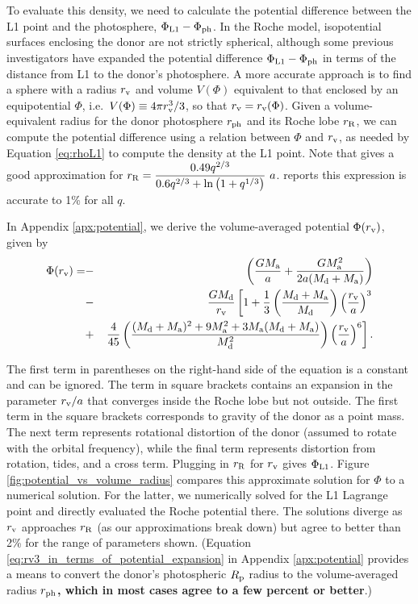 \documentclass{aastex}
\newcommand{\be}{\begin{eqnarray}}
\newcommand{\ee}{\end{eqnarray}}
\newcommand{\rv}{r_{\rm v}}
\begin{document}
To evaluate this density, we need to calculate the potential difference between the L1 point and the photosphere, $\Phi_{\rm L1}-\Phi_{\rm ph}$. In the Roche model, isopotential surfaces enclosing the donor are not strictly spherical, although some previous investigators have expanded the potential difference $\Phi_{\rm L1}-\Phi_{\rm ph}$ in terms of the distance from L1 to the donor's photosphere. A more accurate approach is to find a sphere with a radius $\rv$ and volume $V(\Phi)$ equivalent to that enclosed by an equipotential $\Phi$, i.e.\ $V(\Phi) \equiv 4\pi r_{\rm v}^3/3$, so that $r_{\rm v} = r_{\rm v}(\Phi)$. Given a volume-equivalent radius for the donor photosphere $r_{\rm ph}$ and its Roche lobe $r_{\rm R}$, we can compute the potential difference using a relation between $\Phi$ and $\rv$, as needed by Equation \ref{eq:rhoL1} to compute the density at the L1 point. Note that \citet{1983ApJ...268..368E} gives a good approximation for $r_{\rm R} = \dfrac{0.49 q^{2/3}}{0.6 q^{2/3} + \ln\left( 1 + q^{1/3} \right)}\ a$. \citet{1983ApJ...268..368E} reports this expression is accurate to 1\% for all $q$.

In Appendix \ref{apx:potential}, we derive the volume-averaged potential $\Phi(r_{\rm v})$, given by 
\be
\Phi(\rv) = &-& \left(  \frac{GM_{\rm a}}{a} + \frac{ GM_{\rm a}^2 }{2a(M_{\rm d}+M_{\rm a})} \right)
\nonumber \\ & - & 
 \frac{GM_{\rm d}}{\rv} \left[ 1 + \frac{1}{3} \left( \frac{M_{\rm d}+M_{\rm a}}{M_{\rm d}} \right) \left( \frac{\rv}{a} \right)^3
 \right. \nonumber \\ & + & \left.
 \frac{4}{45} \left( \frac{(M_{\rm d}+M_{\rm a})^2 + 9M_{\rm a}^2 + 3M_{\rm a}(M_{\rm d}+M_{\rm a})}{M_{\rm d}^2}\right) \left( \frac{\rv}{a} \right)^6
\right].
\label{eq:phi_vs_rv}
\ee

The first term in parentheses on the right-hand side of the equation is a constant and can be ignored. The term in square brackets contains an expansion in the parameter $\rv/a$ that converges inside the Roche lobe but not outside. The first term in the square brackets corresponds to gravity of the donor as a point mass. The next term represents rotational distortion of the donor (assumed to rotate with the orbital frequency), while the final term represents distortion from rotation, tides, and a cross term. Plugging in $r_{\rm R}$ for $r_{\rm v}$ gives $\Phi_{\rm L1}$. Figure \ref{fig:potential_vs_volume_radius} compares this approximate solution for $\Phi$ to a numerical solution. For the latter, we numerically solved for the L1 Lagrange point and directly evaluated the Roche potential there. The solutions diverge as $\rv$ approaches $r_{\rm R}$ (as our approximations break down) but agree to better than 2\% for the range of parameters shown. (Equation \ref{eq:rv3_in_terms_of_potential_expansion} in Appendix \ref{apx:potential} provides a means to convert the donor's photospheric $R_{\rm p}$ radius to the volume-averaged radius $r_{\rm ph}${\bf, which in most cases agree to a few percent or better}.)
\end{document}
